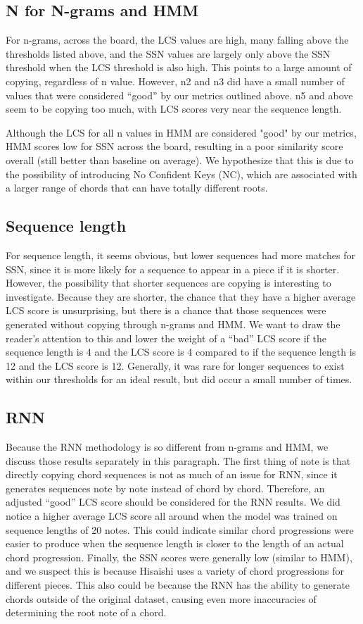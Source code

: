 \documentclass[11pt,a4paper]{article}
\begin{document}
\subsection{N for N-grams and HMM}
For n-grams, across the board, the LCS values are high, many falling above the thresholds listed above, and the SSN values are largely only above the SSN threshold when the LCS threshold is also high. This points to a large amount of copying, regardless of n value. However, n2 and n3 did have a small number of values that were considered “good” by our metrics outlined above. n5 and above seem to be copying too much, with LCS scores very near the sequence length. 

Although the LCS for all n values in HMM are considered "good" by our metrics, HMM scores low for SSN across the board, resulting in a poor similarity score overall (still better than baseline on average). We hypothesize that this is due to the possibility of introducing No Confident Keys (NC), which are associated with a larger range of chords that can have totally different roots. 

\subsection{Sequence length}
For sequence length, it seems obvious, but lower sequences had more matches for SSN, since it is more likely for a sequence to appear in a piece if it is shorter. However, the possibility that shorter sequences are copying is interesting to investigate. Because they are shorter, the chance that they have a higher average LCS score is unsurprising, but there is a chance that those sequences were generated without copying through n-grams and HMM. We want to draw the reader’s attention to this and lower the weight of a “bad” LCS score if the sequence length is 4 and the LCS score is 4 compared to if the sequence length is 12 and the LCS score is 12. Generally, it was rare for longer sequences to exist within our thresholds for an ideal result, but did occur a small number of times.

\subsection{RNN}
Because the RNN methodology is so different from n-grams and HMM, we discuss those results separately in this paragraph. The first thing of note is that directly copying chord sequences is not as much of an issue for RNN, since it generates sequences note by note instead of chord by chord. Therefore, an adjusted “good” LCS score should be considered for the RNN results. We did notice a higher average LCS score all around when the model was trained on sequence lengths of 20 notes. This could indicate similar chord progressions were easier to produce when the sequence length is closer to the length of an actual chord progression. Finally, the SSN scores were generally low (similar to HMM), and we suspect this is because Hisaishi uses a variety of chord progressions for different pieces. This also could be because the RNN has the ability to generate chords outside of the original dataset, causing even more inaccuracies of determining the root note of a chord.
\end{document}
